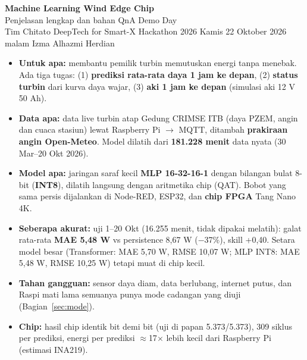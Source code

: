 \documentclass[10.5pt,a4paper]{article}
\begin{document}
\sloppy\setlength{\emergencystretch}{3em}

\begin{center}
{\LARGE\bfseries Machine Learning Wind Edge Chip}\\[3pt]
{\large Penjelasan lengkap dan bahan QnA Demo Day}\\[2pt]
{\normalsize Tim Chitato \textbullet{} DeepTech for Smart-X Hackathon 2026 \textbullet{} Kamis 22 Oktober 2026 malam \textbullet{} Izma Alhazmi Herdian}
\end{center}

\begin{ringkas}
\begin{itemize}
  \item \textbf{Untuk apa:} membantu pemilik turbin memutuskan energi tanpa menebak. Ada tiga tugas: (1) \textbf{prediksi rata-rata daya 1 jam ke depan},
        (2) \textbf{status turbin} dari kurva daya wajar, (3) \textbf{aki 1 jam ke depan} (simulasi aki 12 V 50 Ah).
  \item \textbf{Data apa:} data live turbin atap Gedung CRIMSE ITB (daya PZEM, angin dan cuaca stasiun) lewat Raspberry Pi $\to$ MQTT,
        ditambah \textbf{prakiraan angin Open-Meteo}. Model dilatih dari \textbf{181.228 menit} data nyata (30 Mar--20 Okt 2026).
  \item \textbf{Model apa:} jaringan saraf kecil \textbf{MLP 16-32-16-1} dengan bilangan bulat 8-bit (\textbf{INT8}), dilatih langsung dengan
        aritmetika chip (QAT). Bobot yang sama persis dijalankan di Node-RED, ESP32, dan \textbf{chip FPGA} Tang Nano 4K.
  \item \textbf{Seberapa akurat:} uji 1--20 Okt (16.255 menit, tidak dipakai melatih): galat rata-rata \textbf{MAE 5,48 W} vs persistence
        8,67 W ($-$37\%), skill +0,40. Setara model besar (Transformer: MAE 5,70 W, RMSE 10,07 W; MLP INT8: MAE 5,48 W, RMSE 10,25 W) tetapi muat di chip kecil.
  \item \textbf{Tahan gangguan:} sensor daya diam, data berlubang, internet putus, dan Raspi mati lama semuanya punya mode cadangan
        yang diuji (Bagian~\ref{sec:mode}).
  \item \textbf{Chip:} hasil chip identik bit demi bit (uji di papan 5.373/5.373), 309 siklus per prediksi, energi per prediksi
        $\approx$17$\times$ lebih kecil dari Raspberry Pi (estimasi INA219).
\end{itemize}
\end{ringkas}
\end{document}
